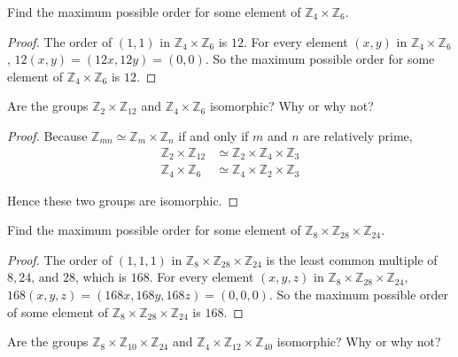 \newpage
\begin{exercise}
    Find the maximum possible order for some element of $\mathbb{Z}_{4}\times\mathbb{Z}_{6}$.
\end{exercise}

\begin{proof}
    The order of $(1,1)$ in $\mathbb{Z}_{4}\times\mathbb{Z}_{6}$ is $12$. For every element $(x,y)$ in $\mathbb{Z}_{4}\times\mathbb{Z}_{6}$, $12(x,y) = (12x,12y) = (0,0)$. So the maximum possible order for some element of $\mathbb{Z}_{4}\times\mathbb{Z}_{6}$ is $12$.
\end{proof}

\newpage
\begin{exercise}
    Are the groups $\mathbb{Z}_{2}\times\mathbb{Z}_{12}$ and $\mathbb{Z}_{4}\times\mathbb{Z}_{6}$ isomorphic? Why or why not?
\end{exercise}

\begin{proof}
    Because $\mathbb{Z}_{mn}\simeq \mathbb{Z}_{m}\times\mathbb{Z}_{n}$ if and only if $m$ and $n$ are relatively prime,
    \begin{align*}
        \mathbb{Z}_{2}\times\mathbb{Z}_{12} & \simeq \mathbb{Z}_{2}\times\mathbb{Z}_{4}\times\mathbb{Z}_{3} \\
        \mathbb{Z}_{4}\times\mathbb{Z}_{6}  & \simeq \mathbb{Z}_{4}\times\mathbb{Z}_{2}\times\mathbb{Z}_{3}
    \end{align*}

    Hence these two groups are isomorphic.
\end{proof}

\newpage
\begin{exercise}
    Find the maximum possible order for some element of $\mathbb{Z}_{8}\times\mathbb{Z}_{28}\times\mathbb{Z}_{24}$.
\end{exercise}

\begin{proof}
    The order of $(1,1,1)$ in $\mathbb{Z}_{8}\times\mathbb{Z}_{28}\times\mathbb{Z}_{24}$ is the least common multiple of $8,24$, and $28$, which is $168$. For every element $(x,y,z)$ in $\mathbb{Z}_{8}\times\mathbb{Z}_{28}\times\mathbb{Z}_{24}$, $168(x,y,z) = (168x,168y,168z) = (0,0,0)$. So the maximum possible order of some element of $\mathbb{Z}_{8}\times\mathbb{Z}_{28}\times\mathbb{Z}_{24}$ is $168$.
\end{proof}

\newpage
\begin{exercise}
    Are the groups $\mathbb{Z}_{8}\times\mathbb{Z}_{10}\times\mathbb{Z}_{24}$ and $\mathbb{Z}_{4}\times\mathbb{Z}_{12}\times\mathbb{Z}_{40}$ isomorphic? Why or why not?
\end{exercise}

